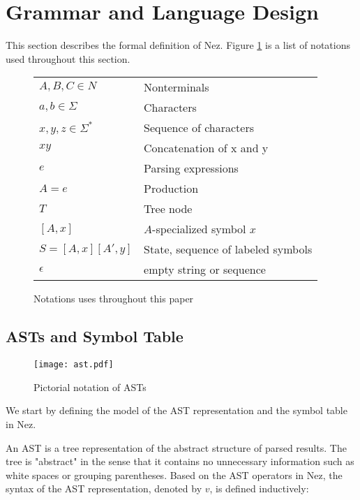 \documentclass[preprint]{sigplanconf}
\begin{document}
\section{Grammar and Language Design} \label{sec:design}

This section describes the formal definition of Nez. Figure \ref{fig:notation} is a list of notations used throughout this section.

\begin{figure}
\begin{tabular}{ll}
$A,B,C \in N$ & Nonterminals
\\
$a,b \in \Sigma$ & Characters
\\
$x,y,z \in \Sigma^{*}$ & Sequence of characters
\\
$xy$ & Concatenation of x and y
\\
$e$ & Parsing expressions
\\
$A=e$ & Production 
\\
$T$ & Tree node 
\\
$[A, x]$ & $A$-specialized symbol $x$
\\
$S=[A,x][A', y]$ & State, sequence of labeled symbols
\\
$\epsilon$ & empty string or sequence
\\
\end{tabular}
\caption{Notations uses throughout this paper}
\label{fig:notation}
\end{figure}

\subsection{ASTs and Symbol Table}

\begin{figure}[tb]
\begin{center}
\texttt{[image: ast.pdf]}
\end{center}
\caption{Pictorial notation of ASTs}
\label{fig:ast}
\end{figure}

We start by defining the model of the AST representation and the symbol table in Nez.

An AST is a tree representation of the abstract structure of parsed results. The tree is "abstract" in the  sense that it contains no unnecessary information such as white spaces or grouping parentheses. Based on the AST operators in Nez, the syntax of the AST representation, denoted by $v$, is defined inductively:
\end{document}

